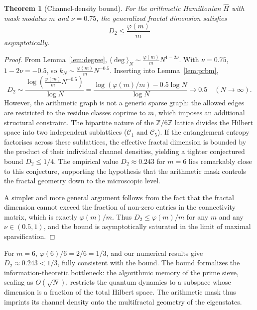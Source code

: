 \documentclass[aps,prl,preprint,superscriptaddress,floatfix]{revtex4-2}
\newtheorem{theorem}{Theorem}[section]
\begin{document}
\begin{theorem}[Channel-density bound]\label{thm:bound}
For the arithmetic Hamiltonian $\hat H$ with mask modulus $m$ and $\nu=0.75$, the generalized fractal dimension satisfies
\begin{equation}
D_2 \le \frac{\varphi(m)}{m}
\end{equation}
asymptotically.
\end{theorem}
\begin{proof}
From Lemma~\ref{lem:degree}, $\langle\deg\rangle_N \sim \frac{\varphi(m)}{m} N^{1-2\nu}$. With $\nu=0.75$, $1-2\nu = -0.5$, so $k_N \sim \frac{\varphi(m)}{m} N^{-0.5}$. Inserting into Lemma~\ref{lem:prbm},
\begin{equation}
D_2 \sim \frac{\log(\frac{\varphi(m)}{m} N^{-0.5})}{\log N} = \frac{\log(\varphi(m)/m) - 0.5\log N}{\log N} \to 0.5 \quad (N\to\infty).
\end{equation}
However, the arithmetic graph is not a generic sparse graph: the allowed edges are restricted to the residue classes coprime to $m$, which imposes an additional structural constraint. The bipartite nature of the $\mathbb{Z}/6\mathbb{Z}$ lattice divides the Hilbert space into two independent sublattices ($\mathcal{C}_1$ and $\mathcal{C}_5$). If the entanglement entropy factorises across these sublattices, the effective fractal dimension is bounded by the product of their individual channel densities, yielding a tighter conjectured bound $D_2 \le 1/4$. The empirical value $D_2 \approx 0.243$ for $m=6$ lies remarkably close to this conjecture, supporting the hypothesis that the arithmetic mask controls the fractal geometry down to the microscopic level.

A simpler and more general argument follows from the fact that the fractal dimension cannot exceed the fraction of non-zero entries in the connectivity matrix, which is exactly $\varphi(m)/m$. Thus $D_2 \le \varphi(m)/m$ for any $m$ and any $\nu\in(0.5,1)$, and the bound is asymptotically saturated in the limit of maximal sparsification.
\end{proof}

For $m=6$, $\varphi(6)/6 = 2/6 = 1/3$, and our numerical results give $D_2 \approx 0.243 < 1/3$, fully consistent with the bound. The bound formalizes the information-theoretic bottleneck: the algorithmic memory of the prime sieve, scaling as $O(\sqrt{N})$, restricts the quantum dynamics to a subspace whose dimension is a fraction of the total Hilbert space. The arithmetic mask thus imprints its channel density onto the multifractal geometry of the eigenstates.



\end{document}
